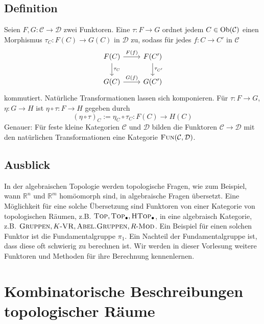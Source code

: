 \subsection[Definition: Natürliche Transformation]{Definition} %
\label{sub:16}
Seien $F,G \colon \mathcal{C} \to \mathcal{D}$ zwei Funktoren. Eine  $\tau \colon F \to G$ ordnet jedem $C \in \operatorname{Ob}(\mathcal{C})$ einen 
Morphismus $\tau_C \colon F(C) \to G(C)$ in $\mathcal{D}$ zu, sodass für jedes $f \colon C \to C'$ in $\mathcal{C}$
\[
	\begin{tikzcd}
		F(C) \rar["F(f)"] \dar["\tau_C"]& F(C') \dar["\tau_{C'}"] \\
		G(C) \rar["G(f)"] & G(C')
	\end{tikzcd}
\]
kommutiert.
Natürliche Transformationen lassen sich komponieren. Für $\tau \colon F \to G$, $\eta \colon G \to H$ ist $\eta \circ \tau \colon F \to H$ gegeben durch
\[
	(\eta \circ \tau)_C :=  \eta_C \circ \tau_C \colon F(C) \to H(C)
\]
Genauer: Für feste kleine Kategorien $\mathcal{C}$ und $\mathcal{D}$ bilden die Funktoren $\mathcal{C} \to \mathcal{D}$ mit den natürlichen Transformationen eine 
Kategorie $\textsc{Fun}(\mathcal{C}, \mathcal{D})$.

\subsection[Ausblick auf Kategorien und Funktoren in der algebraischer Topologie]{Ausblick} %
\label{sub:17}
In der algebraischen Topologie werden topologische Fragen, wie zum Beispiel, wann $\mathds{R}^n$ und $\mathds{R}^m$ homöomorph sind, in algebraische Fragen übersetzt. Eine
Möglichkeit für eine solche Übersetzung sind Funktoren von einer Kategorie von topologischen Räumen, z.B. $\textsc{Top}, \textsc{Top}_\bullet, \textsc{HTop}_\bullet$, in eine algebraisch Kategorie,
z.B. $\textsc{Gruppen}, K\text{-}\textsc{VR}, \textsc{Abel.Gruppen}, R\text{-}\textsc{Mod}$. Ein Beispiel für einen solchen Funktor ist die Fundamentalgruppe $\pi_1$. Ein Nachteil der Fundamentalgruppe ist,
dass diese oft schwierig zu berechnen ist. Wir werden in dieser Vorlesung weitere Funktoren und Methoden für ihre Berechnung kennenlernen.

\newpage

\section{Kombinatorische Beschreibungen topologischer Räume} %
\label{sec:2}
